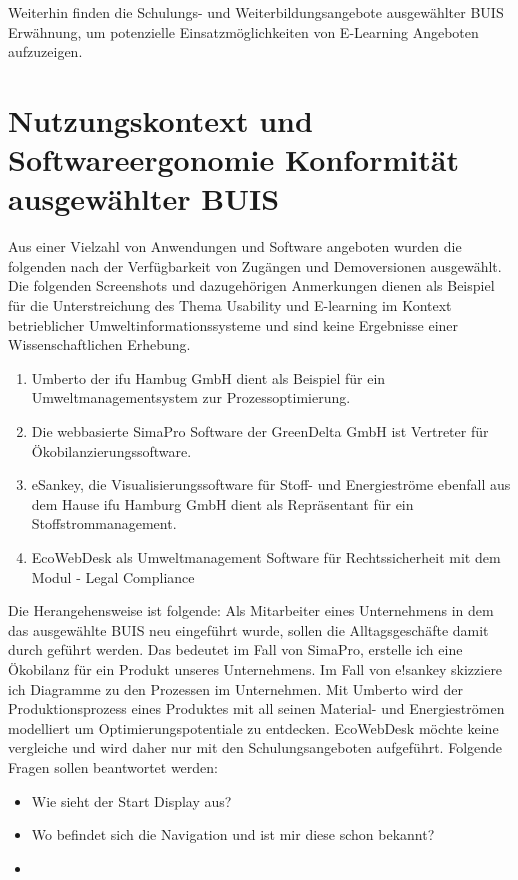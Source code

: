 \documentclass[a4paper, 12pt, twoside, BCOR=20mm, DIV=calc, abstracton, parskip=half*, toc=bibliography, toc=listof, headsepline, footsepline, headings=small, numbers=enddot]{scrreprt}
\begin{document}
	Weiterhin finden die Schulungs- und Weiterbildungsangebote ausgewählter \ac{BUIS} Erwähnung, um potenzielle Einsatzmöglichkeiten von E-Learning Angeboten aufzuzeigen.  
	
	\section{Nutzungskontext und Softwareergonomie Konformität ausgewählter \ac{BUIS}}
	Aus einer Vielzahl von Anwendungen und Software angeboten wurden die folgenden nach der Verfügbarkeit von Zugängen und Demoversionen ausgewählt. Die folgenden Screenshots und dazugehörigen Anmerkungen dienen als Beispiel für die Unterstreichung des Thema Usability und E-learning im Kontext betrieblicher Umweltinformationssysteme und sind keine Ergebnisse einer Wissenschaftlichen Erhebung. 
	\begin{enumerate}
	\item Umberto der ifu Hambug GmbH dient als Beispiel für ein Umweltmanagementsystem zur Prozessoptimierung.\\
	\item Die webbasierte SimaPro Software der GreenDelta GmbH ist Vertreter für Ökobilanzierungssoftware. \\
	\item eSankey, die Visualisierungssoftware für Stoff- und Energieströme ebenfall aus dem Hause ifu Hamburg GmbH dient als Repräsentant für ein Stoffstrommanagement. 
	\item EcoWebDesk als Umweltmanagement Software für Rechtssicherheit mit dem Modul - Legal Compliance
	\end{enumerate}

Die Herangehensweise ist folgende: Als Mitarbeiter eines Unternehmens in dem das ausgewählte \ac{BUIS} neu eingeführt wurde, sollen die Alltagsgeschäfte damit durch geführt werden. Das bedeutet im Fall von SimaPro, erstelle ich eine Ökobilanz für ein Produkt unseres Unternehmens. Im Fall von e!sankey skizziere ich Diagramme zu den Prozessen im Unternehmen. Mit Umberto wird der Produktionsprozess eines Produktes mit all seinen Material- und Energieströmen modelliert um Optimierungspotentiale zu entdecken. EcoWebDesk möchte keine vergleiche und wird daher nur mit den Schulungsangeboten aufgeführt.    
Folgende Fragen sollen beantwortet werden:
\begin{itemize}
\item Wie sieht der Start Display aus?
\item Wo befindet sich die Navigation und ist mir diese schon bekannt?
\item 
\end{itemize}
	
\end{document}
